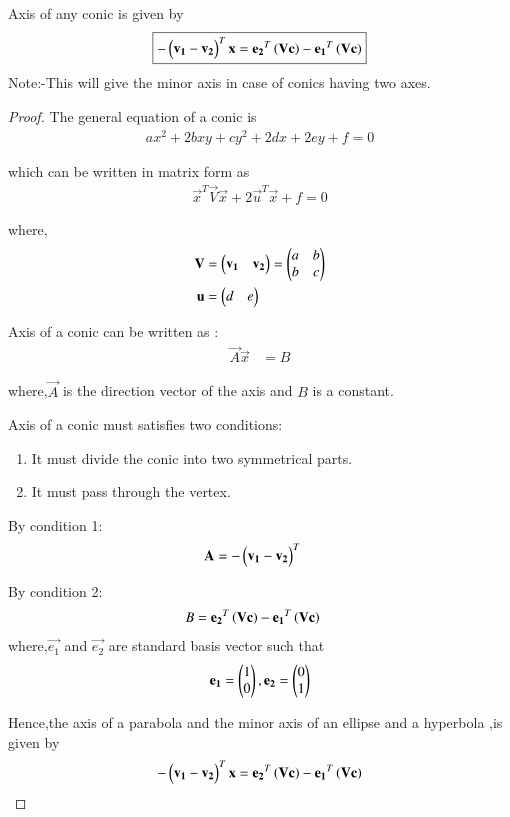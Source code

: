 \documentclass[journal,12pt,twocolumn]{IEEEtran}
\begin{document}
\begin{lemma}
Axis of any conic is given by
\begin{align}
    \boxed{-\begin{pmatrix}\mathbf{v_1}-\mathbf{v_2}\end{pmatrix}^T\mathbf{x} = \mathbf{e_2}^T\left(\mathbf{V}\mathbf{c}\right) - \mathbf{e_1}^T\left(\mathbf{V}\mathbf{c}\right)}
\end{align}
Note:-This will give the minor axis in case of conics having two axes.
\end{lemma}
\begin{proof}
The general equation of a conic is
\begin{align}
  ax^2+2bxy+cy^2+2dx+2ey+f=0
\end{align}

which can be written in matrix form as
\begin{align}
    \vec{x}^T\vec{V}\vec{x} + 2\vec{u}^T\vec{x} + f =0
\end{align}

where,
\begin{align}
    \mathbf{V} &= \begin{pmatrix}\mathbf{v_1} & \mathbf{v_2}\end{pmatrix}=\begin{pmatrix}a & b \\ b& c\end{pmatrix}
    \\
    \mathbf{u} &= \begin{pmatrix}d & e\end{pmatrix}
\end{align}

Axis of a conic can be written as :
\begin{align}
    \vec{A}\vec{x} &= B
\end{align}

where,$\vec{A}$ is the direction vector of the axis and $B$ is a constant.

Axis of a conic must satisfies two conditions:
\begin{enumerate}
    \item  It must divide the conic into two symmetrical parts. 
    \item  It must pass through the vertex.
\end{enumerate}

By condition 1:
\begin{align}
    \mathbf{A} &= -\begin{pmatrix}\mathbf{v_1}-\mathbf{v_2}\end{pmatrix}^T
\end{align}

By condition 2:
\begin{align}
    B &= \mathbf{e_2}^T\left(\mathbf{V}\mathbf{c}\right) - \mathbf{e_1}^T\left(\mathbf{V}\mathbf{c}\right)
\end{align}
where,$\vec{e_1}$ and $\vec{e_2}$ are standard basis vector such that
\begin{align}
    \mathbf{e_1}=\begin{pmatrix}1 \\0\end{pmatrix},\mathbf{e_2}=\begin{pmatrix}0 \\ 1\end{pmatrix}
\end{align}

Hence,the axis of a parabola and the minor axis of an ellipse and a hyperbola ,is given by
\begin{align}
    -\begin{pmatrix}\mathbf{v_1}-\mathbf{v_2}\end{pmatrix}^T\mathbf{x} = \mathbf{e_2}^T\left(\mathbf{V}\mathbf{c}\right) - \mathbf{e_1}^T\left(\mathbf{V}\mathbf{c}\right)
\end{align}
\end{proof}
\end{document}

